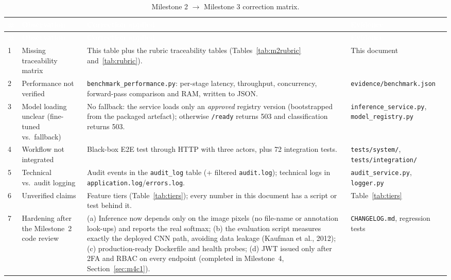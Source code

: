 \documentclass[12pt,a4paper]{article}
\newcommand{\fp}[1]{\nolinkurl{#1}}
\newcommand{\hd}[1]{\textcolor{white}{\textbf{#1}}}
\begin{document}
\begin{longtable}{C{0.3cm} L{3.0cm} p{7.0cm} L{3.2cm}}
\caption{Milestone 2 $\to$ Milestone 3 correction matrix.}\label{tab:corrections}\\
\hd{\#} & \hd{Observation} & \hd{Correction applied} & \hd{Evidence} \\
\endfirsthead
{}
\hd{\#} & \hd{Observation} & \hd{Correction applied} & \hd{Evidence} \\
\endhead
{}
1 & Missing traceability matrix & This table plus the rubric traceability tables (Tables~\ref{tab:m2rubric} and~\ref{tab:rubric}). & This document \\
2 & Performance not verified & \fp{benchmark_performance.py}: per-stage latency, throughput, concurrency, forward-pass comparison and RAM, written to JSON. & \fp{evidence/benchmark.json} \\
3 & Model loading unclear (fine-tuned vs.\ fallback) & No fallback: the service loads only an \emph{approved} registry version (bootstrapped from the packaged artefact); otherwise \texttt{/ready} returns 503 and classification returns 503. & \fp{inference_service.py}, \texttt{model\_registry.py} \\
4 & Workflow not integrated & Black-box E2E test through HTTP with three actors, plus 72 integration tests. & \texttt{tests/system/}, \fp{tests/integration/} \\
5 & Technical vs.\ audit logging & Audit events in the \texttt{audit\_log} table (+ filtered \texttt{audit.log}); technical logs in \texttt{application.log}/\texttt{errors.log}. & \texttt{audit\_service.py}, \texttt{logger.py} \\
6 & Unverified claims & Feature tiers (Table~\ref{tab:tiers}); every number in this document has a script or test behind it. & Table~\ref{tab:tiers} \\
7 & Hardening after the Milestone~2 code review & (a) Inference now depends only on the image pixels (no file-name or annotation look-ups) and reports the real softmax; (b) the evaluation script measures exactly the deployed CNN path, avoiding data leakage (Kaufman et al., 2012); (c) production-ready Dockerfile and health probes; (d) JWT issued only after 2FA and RBAC on every endpoint (completed in Milestone~4, Section~\ref{sec:m4c1}). & \fp{CHANGELOG.md}, regression tests \\
\end{longtable}
\end{document}
